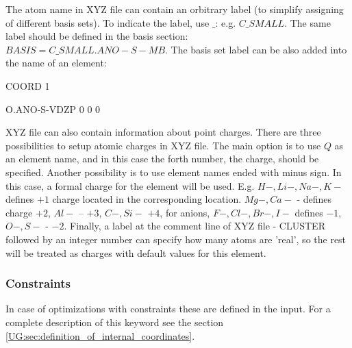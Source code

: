 The atom name in XYZ file can contain an orbitrary label (to simplify assigning of different
basis sets). To indicate the label, use $\_$: e.g. $C\_SMALL$. The same label should be
defined in the basis section: $BASIS=C\_SMALL.ANO-S-MB$. The basis set label can be also
added into the name of an element:

\begin{sourcelisting}
COORD
1

O.ANO-S-VDZP 0 0 0
\end{sourcelisting}

XYZ file can also contain information about point charges. There are three possibilities to
setup atomic charges in XYZ file. The main option is to use $Q$ as an element name, and in this
case the forth number, the charge, should be specified. Another possibility is to use element
names ended with minus sign. In this case, a formal charge for the element will be used.
E.g. $H-, Li-, Na-, K-$ defines $+1$ charge located in the corresponding location.
$Mg-, Ca-$ - defines charge $+2$, $Al-$ -- $+3$, $C-, Si-$ $+4$, for anions, $F-, Cl-, Br-, I-$ defines $-1$,
$O-, S-$ - $-2$. Finally, a label at the comment line of XYZ file - CLUSTER followed by
an integer number can specify how many atoms are 'real', so the rest will be treated as
charges with default values for this element.


\subsubsection{Constraints}
In case of optimizations with constraints these are defined in the  input.
For a complete description of this keyword see the section
\ref{UG:sec:definition_of_internal_coordinates}.

